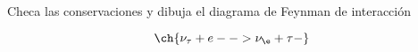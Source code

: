 \documentclass[./../main.tex]{subfiles}
\begin{document}
    \begin{exercise}
        Checa las conservaciones y dibuja el diagrama de Feynman de interacción

        \begin{equation*}
            \ch{\nu_{\tau} + e- -> \nu_{\e} + \tau-}
        \end{equation*}
    \end{exercise}
\end{document}
